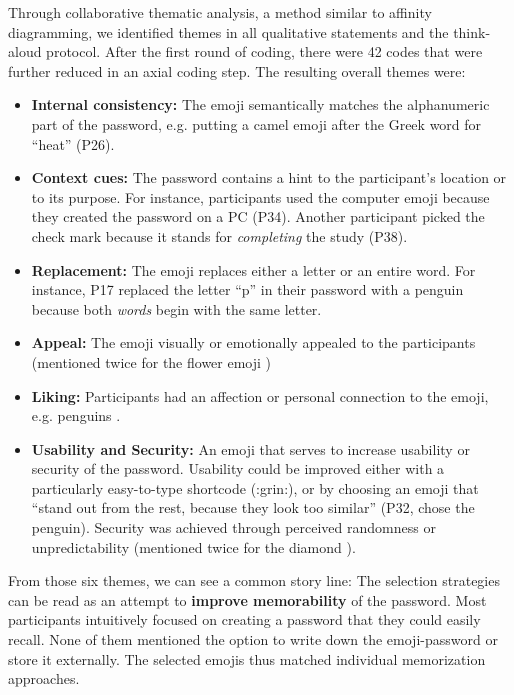 Through collaborative thematic analysis, a method similar to affinity diagramming, we identified themes in all qualitative statements and the think-aloud protocol. After the first round of coding, there were 42 codes that were further reduced in an axial coding step. The resulting overall themes were:
\begin{itemize}[leftmargin=*]
	\item \textbf{Internal consistency:} The emoji semantically matches the alphanumeric part of the password, e.g. putting a camel emoji  after the Greek word for ``heat'' (P26). 
	\item \textbf{Context cues:} The password contains a hint to the participant's location or to its purpose. For instance, participants used the computer emoji  because they created the password on a PC (P34). Another participant picked the check mark  because it stands for \textit{completing} the study (P38). 
	\item \textbf{Replacement:} The emoji replaces either a letter or an entire word. For instance, P17 replaced the letter ``p'' in their password with a penguin  because both \textit{words} begin with the same letter.
	\item \textbf{Appeal:} The emoji visually or emotionally appealed to the participants (mentioned twice for the flower emoji )
	\item \textbf{Liking:} Participants had an affection or personal connection to the emoji, e.g. penguins .
	\item \textbf{Usability and Security:} An emoji that serves to increase usability or security of the password. Usability could be improved either with a particularly easy-to-type shortcode (:grin:), or by choosing an emoji that ``stand out from the rest, because they look too similar'' (P32, chose the penguin). Security was achieved through perceived randomness or unpredictability (mentioned twice for the diamond ).
\end{itemize}

From those six themes, we can see a common story line: The selection strategies can be read as an attempt to \textbf{improve memorability} of the password. Most participants intuitively focused on creating a password that they could easily recall. None of them mentioned the option to write down the emoji-password or store it externally. The selected emojis thus matched individual memorization approaches.

